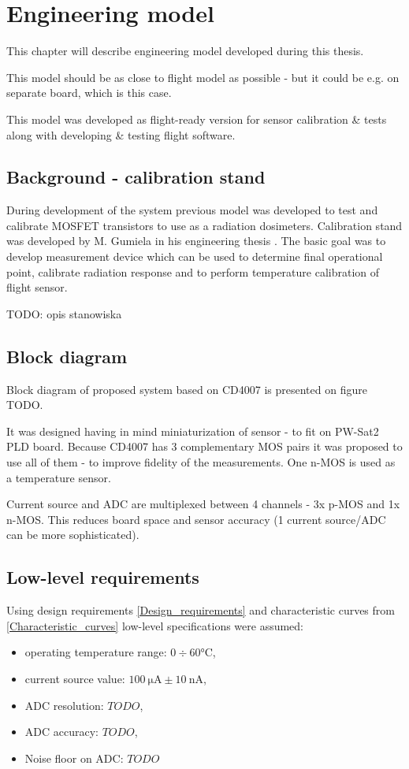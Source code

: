 \chapter{Engineering model}
This chapter will describe engineering model developed during this thesis.

This model should be as close to flight model as possible - but it could be e.g. on separate board, which is this case.

This model was developed as flight-ready version for sensor calibration \& tests along with developing \& testing flight software.

\section{Background - calibration stand}
    During development of the system previous model was developed to test and calibrate MOSFET transistors to use as a radiation dosimeters. Calibration stand was developed by M. Gumiela in his engineering thesis \cite{MGThesis}. The basic goal was to develop measurement device which can be used to determine final operational point, calibrate radiation response and to perform temperature calibration of flight sensor.

    TODO: opis stanowiska


\section{Block diagram}
    Block diagram of proposed system based on CD4007 is presented on figure TODO.

    It was designed having in mind miniaturization of sensor - to fit on PW-Sat2 PLD board. Because CD4007 has 3 complementary MOS pairs it was proposed to use all of them - to improve fidelity of the measurements. One n-MOS is used as a temperature sensor.

    Current source and ADC are multiplexed between 4 channels - 3x p-MOS and 1x n-MOS. This reduces board space and sensor accuracy (1 current source/ADC can be more sophisticated).

\section{Low-level requirements}
    Using design requirements \ref{Design_requirements} and characteristic curves from \ref{Characteristic_curves} low-level specifications were assumed:
    \begin{itemize}
        \item operating temperature range: $0 \div 60 \si{\degreeCelsius}$,
        \item current source value: $\SI{100}{\micro\ampere} \pm \SI{10}{\nano\ampere}$,
        \item ADC resolution: $TODO$,
        \item ADC accuracy: $TODO$,
        \item Noise floor on ADC: $TODO$
    \end{itemize}


